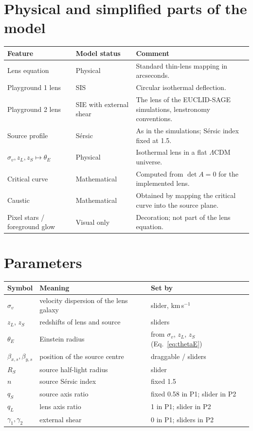\documentclass[11pt,a4paper]{article}
\begin{document}
\section{Physical and simplified parts of the model}
\begin{center}
\begin{tabular}{p{}p{}p{}}
\toprule
Feature & Model status & Comment \\
\midrule
Lens equation & Physical & Standard thin-lens mapping in arcseconds.\\
Playground 1 lens & SIS & Circular isothermal deflection.\\
Playground 2 lens & SIE with external shear & The lens of the EUCLID-SAGE simulations, lenstronomy conventions.\\
Source profile & S\'ersic & As in the simulations; S\'ersic index fixed at 1.5.\\
$\sigma_v,z_L,z_S\mapsto\theta_E$ & Physical & Isothermal lens in a flat $\Lambda$CDM universe.\\
Critical curve & Mathematical & Computed from $\det A=0$ for the implemented lens.\\
Caustic & Mathematical & Obtained by mapping the critical curve into the source plane.\\
Pixel stars / foreground glow & Visual only & Decoration; not part of the lens equation.\\
\bottomrule
\end{tabular}
\end{center}

\section{Parameters}
\begin{center}
\begin{tabular}{lll}
\toprule
Symbol & Meaning & Set by \\
\midrule
$\sigma_v$ & velocity dispersion of the lens galaxy & slider, km\,s$^{-1}$ \\
$z_L$, $z_S$ & redshifts of lens and source & sliders \\
$\theta_E$ & Einstein radius & from $\sigma_v$, $z_L$, $z_S$ (Eq.~\ref{eq:thetaE}) \\
$\beta_{x,s},\beta_{y,s}$ & position of the source centre & draggable / sliders \\
$R_S$ & source half-light radius & slider \\
$n$ & source S\'ersic index & fixed 1.5 \\
$q_S$ & source axis ratio & fixed 0.58 in P1; slider in P2 \\
$q_L$ & lens axis ratio & 1 in P1; slider in P2 \\
$\gamma_1,\gamma_2$ & external shear & 0 in P1; sliders in P2 \\
\bottomrule
\end{tabular}
\end{center}
\end{document}
